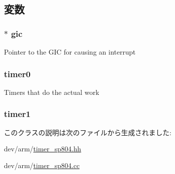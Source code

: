 \subsection{変数}
\hypertarget{classSp804_a2e2266dca56928f63667e994933169ee}{
\subsubsection[{gic}]{$\ast$ {\bf gic}}}
\label{classSp804_a2e2266dca56928f63667e994933169ee}
Pointer to the GIC for causing an interrupt \hypertarget{classSp804_a5a3102d67b545393f0fe81b35f27ee5b}{
\subsubsection[{timer0}]{ {\bf timer0}}}
\label{classSp804_a5a3102d67b545393f0fe81b35f27ee5b}
Timers that do the actual work \hypertarget{classSp804_aac7d019e29140bad89a32896ddaf7c8d}{
\subsubsection[{timer1}]{ {\bf timer1}}}
\label{classSp804_aac7d019e29140bad89a32896ddaf7c8d}


このクラスの説明は次のファイルから生成されました:\begin{DoxyCompactItemize}
\item 
dev/arm/\hyperlink{timer__sp804_8hh}{timer\_\-sp804.hh}\item 
dev/arm/\hyperlink{timer__sp804_8cc}{timer\_\-sp804.cc}\end{DoxyCompactItemize}
